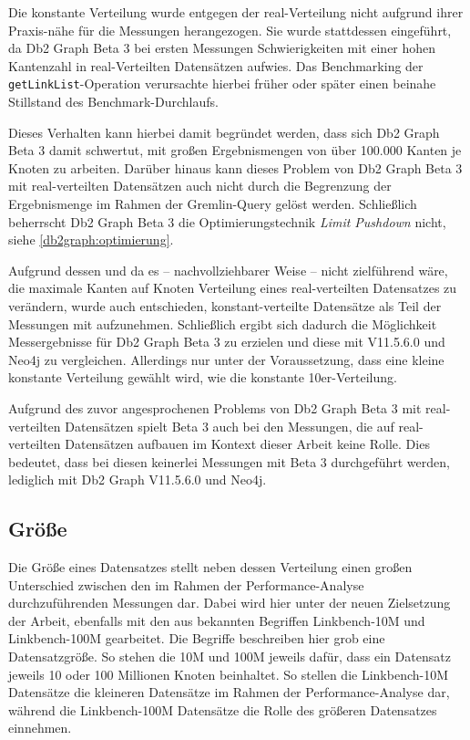 Die konstante Verteilung wurde entgegen der real-Verteilung nicht aufgrund ihrer Praxis-nähe für die Messungen herangezogen. Sie wurde stattdessen eingeführt, da Db2 Graph Beta 3 bei ersten Messungen Schwierigkeiten mit einer hohen Kantenzahl in real-Verteilten Datensätzen aufwies. Das Benchmarking der \texttt{getLinkList}-Operation verursachte hierbei früher oder später einen beinahe Stillstand des Benchmark-Durchlaufs. 

Dieses Verhalten kann hierbei damit begründet werden, dass sich Db2 Graph Beta 3 damit schwertut, mit großen Ergebnismengen von über 100.000 Kanten je Knoten zu arbeiten. Darüber hinaus kann dieses Problem von Db2 Graph Beta 3 mit real-verteilten Datensätzen auch nicht durch die Begrenzung der Ergebnismenge im Rahmen der Gremlin-Query gelöst werden. Schließlich beherrscht Db2 Graph Beta 3 die Optimierungstechnik \textit{Limit Pushdown} nicht, siehe \autoref{db2graph:optimierung}. 

Aufgrund dessen und da es -- nachvollziehbarer Weise -- nicht zielführend wäre, die maximale Kanten auf Knoten Verteilung eines real-verteilten Datensatzes zu verändern, wurde auch entschieden, konstant-verteilte Datensätze als Teil der Messungen mit aufzunehmen. Schließlich ergibt sich dadurch die Möglichkeit Messergebnisse für Db2 Graph Beta 3 zu erzielen und diese mit V11.5.6.0 und Neo4j zu vergleichen. Allerdings nur unter der Voraussetzung, dass eine kleine konstante Verteilung gewählt wird, wie die konstante 10er-Verteilung. 

Aufgrund des zuvor angesprochenen Problems von Db2 Graph  Beta 3 mit real-verteilten Datensätzen spielt Beta 3 auch bei den Messungen, die auf real-verteilten Datensätzen aufbauen im Kontext dieser Arbeit keine Rolle. Dies bedeutet, dass bei diesen keinerlei Messungen mit Beta 3 durchgeführt werden, lediglich mit Db2 Graph V11.5.6.0 und Neo4j. 

\subsection{Größe}
Die Größe eines Datensatzes stellt neben dessen Verteilung einen großen Unterschied zwischen den im Rahmen der Performance-Analyse durchzuführenden Messungen dar. Dabei wird hier unter der neuen Zielsetzung der Arbeit, ebenfalls mit den aus \cite{sigmod_tian} bekannten Begriffen Linkbench-10M und Linkbench-100M gearbeitet. Die Begriffe beschreiben hier grob eine Datensatzgröße. So stehen die 10M und 100M jeweils dafür, dass ein Datensatz jeweils 10 oder 100 Millionen Knoten beinhaltet. So stellen die Linkbench-10M Datensätze die kleineren Datensätze im Rahmen der Performance-Analyse dar, während die Linkbench-100M Datensätze die Rolle des größeren Datensatzes einnehmen. 

